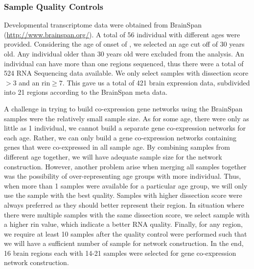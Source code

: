 \subsubsection{Sample Quality Controls}
Developmental transcriptome data were obtained from BrainSpan (\url{http://www.brainspan.org/}).
A total of 56 individual with different ages were provided. 
Considering the age of onset of , we selected an age cut off of 30 years old. 
Any individual older than 30 years old were excluded from the analysis.
An individual can have more than one regions sequenced, thus there were a total of 524 RNA Sequencing data available.
We only select samples with dissection score $>3$ and an \gls{rin}$\ge7$.
This gave us a total of 421 brain expression data, subdivided into 21 regions according to the BrainSpan meta data.

A challenge in trying to build co-expression gene networks using the BrainSpan samples were the relatively small sample size.
As for some age, there were only as little as 1 individual, we cannot build a separate gene co-expression networks for each age. 
Rather, we can only build a gene co-expression networks containing genes that were co-expressed in all sample age. 
By combining samples from different age together, we will have adequate sample size for the network construction.
However, another problem arise when merging all samples together was the possibility of over-representing age groups with more individual. 
Thus, when more than 1 samples were available for a particular age group, we will only use the sample with the best quality.
Samples with higher dissection score were always preferred as they should better represent their region. 
In situation where there were multiple samples with the same dissection score, we select sample with a higher \gls{rin} value, which indicate a better RNA quality.
Finally, for any region, we require at least 10 samples after the quality control were performed such that we will have a sufficient number of sample for network construction.
In the end, 16 brain regions each with 14-21 samples were selected for gene co-expression network construction.



